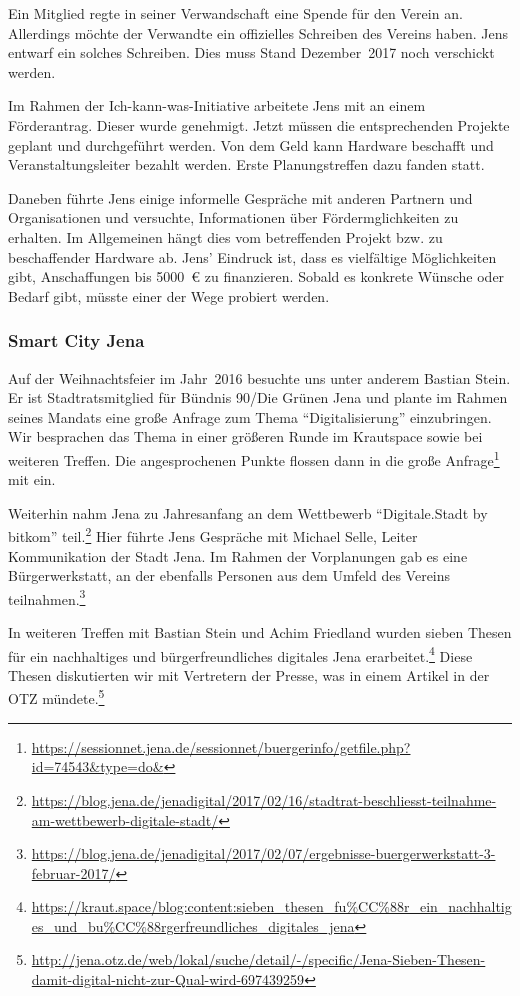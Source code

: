 \documentclass[ngerman]{scrartcl}
\begin{document}
Ein Mitglied regte in seiner Verwandschaft eine Spende für den Verein
an. Allerdings möchte der Verwandte ein offizielles Schreiben des Vereins
haben. Jens entwarf ein solches Schreiben. Dies muss Stand Dezember~2017 noch
verschickt werden.

Im Rahmen der Ich-kann-was-Initiative arbeitete Jens mit an einem
Förderantrag. Dieser wurde genehmigt. Jetzt müssen die entsprechenden Projekte
geplant und durchgeführt werden. Von dem Geld kann Hardware beschafft und
Veranstaltungsleiter bezahlt werden. Erste Planungstreffen dazu fanden statt.

Daneben führte Jens einige informelle Gespräche mit anderen Partnern und
Organisationen und versuchte, Informationen über Fördermglichkeiten zu
erhalten. Im Allgemeinen hängt dies vom betreffenden Projekt bzw. zu
beschaffender Hardware ab. Jens' Eindruck ist, dass es vielfältige Möglichkeiten
gibt, Anschaffungen bis \num{5000}~\euro{} zu finanzieren. Sobald es konkrete
Wünsche oder Bedarf gibt, müsste einer der Wege probiert werden.

\subsubsection{Smart City Jena}

Auf der Weihnachtsfeier im Jahr~2016 besuchte uns unter anderem Bastian
Stein. Er ist Stadtratsmitglied für Bündnis 90/Die Grünen Jena und plante im
Rahmen seines Mandats eine große Anfrage zum Thema \enquote{Digitalisierung}
einzubringen. Wir besprachen das Thema in einer größeren Runde im Krautspace
sowie bei weiteren Treffen. Die angesprochenen Punkte flossen dann in die große
Anfrage\footnote{\url{https://sessionnet.jena.de/sessionnet/buergerinfo/getfile.php?id=74543&type=do&}}
mit ein.

Weiterhin nahm Jena zu Jahresanfang an dem Wettbewerb \enquote{Digitale.Stadt by
bitkom}
teil.\footnote{\url{https://blog.jena.de/jenadigital/2017/02/16/stadtrat-beschliesst-teilnahme-am-wettbewerb-digitale-stadt/}}
Hier führte Jens Gespräche mit Michael Selle, Leiter Kommunikation der Stadt
Jena. Im Rahmen der Vorplanungen gab es eine Bürgerwerkstatt, an der ebenfalls
Personen aus dem Umfeld des Vereins
teilnahmen.\footnote{\url{https://blog.jena.de/jenadigital/2017/02/07/ergebnisse-buergerwerkstatt-3-februar-2017/}}

In weiteren Treffen mit Bastian Stein und Achim Friedland wurden sieben Thesen
für ein nachhaltiges und bürgerfreundliches digitales Jena
erarbeitet.\footnote{\url{https://kraut.space/blog:content:sieben_thesen_fu\%CC\%88r_ein_nachhaltiges_und_bu\%CC\%88rgerfreundliches_digitales_jena}}
Diese Thesen diskutierten wir mit Vertretern der Presse, was in einem Artikel in
der OTZ
mündete.\footnote{\url{http://jena.otz.de/web/lokal/suche/detail/-/specific/Jena-Sieben-Thesen-damit-digital-nicht-zur-Qual-wird-697439259}}
\end{document}
